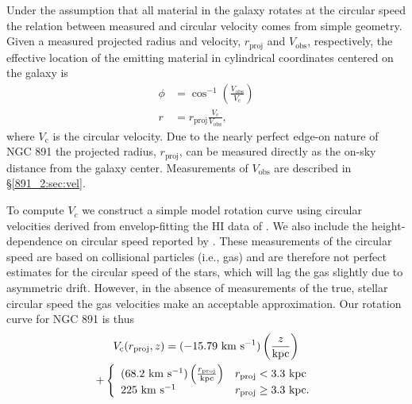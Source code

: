 Under the assumption that all material in the galaxy rotates at the
circular speed the relation between measured and circular velocity
comes from simple geometry. Given a measured projected radius and
velocity, $r_{\mathrm{proj}}$ and $V_{\mathrm{obs}}$, respectively,
the effective location of the emitting material in cylindrical
coordinates centered on the galaxy is
\begin{align}
  \label{891_2:eq:vel_LOS}
  \phi &= \cos^{-1}\left(\frac{V_{\mathrm{obs}}}{V_{\mathrm{c}}}\right)\\
  r &= r_{\mathrm{proj}}\frac{V_{\mathrm{c}}}{V_{\mathrm{obs}}},
\end{align}
where $V_{\mathrm{c}}$ is the circular velocity. Due to the nearly
perfect edge-on nature of NGC 891 the projected radius,
$r_\mathrm{proj}$, can be measured directly as the on-sky distance
from the galaxy center. Measurements of $V_\mathrm{obs}$ are described
in \S\ref{891_2:sec:vel}.

To compute $V_c$ we construct a simple model rotation curve using
circular velocities derived from envelop-fitting the HI data of
\citet{Swaters97}. We also include the height-dependence on circular
speed reported by \citet{Oosterloo07}. These measurements of the
circular speed are based on collisional particles (i.e., gas) and are
therefore not perfect estimates for the circular speed of the stars,
which will lag the gas slightly due to asymmetric drift. However, in
the absence of measurements of the true, stellar circular speed the
gas velocities make an acceptable approximation. Our rotation curve
for NGC 891 is thus
\begin{multline}
  V_{\mathrm{c}}(r_{\mathrm{proj}},z) =
  (-15.79~\mathrm{\mathrm{km\ s^{-1}}} )\left(\frac{z}{\mathrm{kpc}}\right) \\ 
  + \left\{
    \begin{array}{ll}
      (68.2~\mathrm{\mathrm{km\ s^{-1}}} )\left(\frac{r_{\mathrm{proj}}}{\mathrm{kpc}}\right)
      & r_{\mathrm{proj}} < 3.3~\mathrm{kpc} \\ 225~\mathrm{\mathrm{km\ s^{-1}}}  &
      r_{\mathrm{proj}} \geq 3.3~\mathrm{kpc} .\\
    \end{array}
    \right.
\end{multline}

